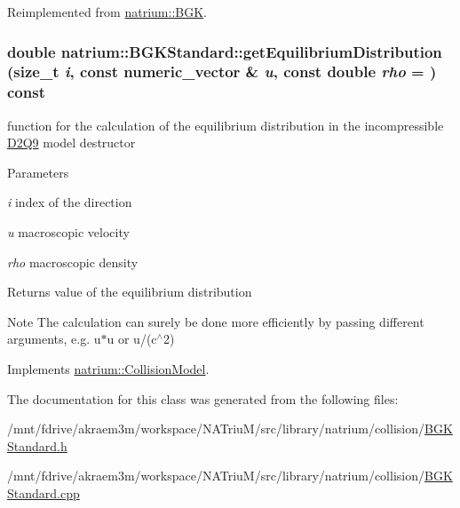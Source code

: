 Reimplemented from \hyperlink{classnatrium_1_1BGK_a9fa1c980217a183fc4762954e86ba36d}{natrium::BGK}.\hypertarget{classnatrium_1_1BGKStandard_a3d45ef2fe5536bf14914f99297477754}{
\subsubsection[{getEquilibriumDistribution}]{\setlength{\rightskip}{0pt plus 5cm}double natrium::BGKStandard::getEquilibriumDistribution (size\_\-t {\em i}, \/  const numeric\_\-vector \& {\em u}, \/  const double {\em rho} = {}) const}}
\label{classnatrium_1_1BGKStandard_a3d45ef2fe5536bf14914f99297477754}


function for the calculation of the equilibrium distribution in the incompressible \hyperlink{classnatrium_1_1D2Q9}{D2Q9} model destructor


\begin{DoxyParams}{Parameters}
\item[{\em i}]index of the direction \item[{\em u}]macroscopic velocity \item[{\em rho}]macroscopic density \end{DoxyParams}
\begin{DoxyReturn}{Returns}
value of the equilibrium distribution 
\end{DoxyReturn}
\begin{DoxyNote}{Note}
The calculation can surely be done more efficiently by passing different arguments, e.g. u$\ast$u or u/(c$^\wedge$2) 
\end{DoxyNote}


Implements \hyperlink{classnatrium_1_1CollisionModel_a88b382d63da80e950bc58e8afad769a6}{natrium::CollisionModel}.

The documentation for this class was generated from the following files:\begin{DoxyCompactItemize}
\item 
/mnt/fdrive/akraem3m/workspace/NATriuM/src/library/natrium/collision/\hyperlink{BGKStandard_8h}{BGKStandard.h}\item 
/mnt/fdrive/akraem3m/workspace/NATriuM/src/library/natrium/collision/\hyperlink{BGKStandard_8cpp}{BGKStandard.cpp}\end{DoxyCompactItemize}
